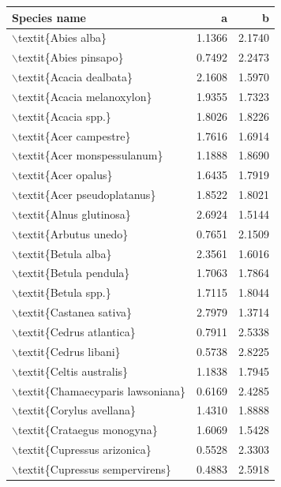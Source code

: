\begin{table}[ht]
\centering
\begin{tabular}{lrr}
  \hline
Species name & a & b \\ 
  \hline
$\backslash$textit\{Abies alba\} & 1.1366 & 2.1740 \\ 
  $\backslash$textit\{Abies pinsapo\} & 0.7492 & 2.2473 \\ 
  $\backslash$textit\{Acacia dealbata\} & 2.1608 & 1.5970 \\ 
  $\backslash$textit\{Acacia melanoxylon\} & 1.9355 & 1.7323 \\ 
  $\backslash$textit\{Acacia spp.\} & 1.8026 & 1.8226 \\ 
  $\backslash$textit\{Acer campestre\} & 1.7616 & 1.6914 \\ 
  $\backslash$textit\{Acer monspessulanum\} & 1.1888 & 1.8690 \\ 
  $\backslash$textit\{Acer opalus\} & 1.6435 & 1.7919 \\ 
  $\backslash$textit\{Acer pseudoplatanus\} & 1.8522 & 1.8021 \\ 
  $\backslash$textit\{Alnus glutinosa\} & 2.6924 & 1.5144 \\ 
  $\backslash$textit\{Arbutus unedo\} & 0.7651 & 2.1509 \\ 
  $\backslash$textit\{Betula alba\} & 2.3561 & 1.6016 \\ 
  $\backslash$textit\{Betula pendula\} & 1.7063 & 1.7864 \\ 
  $\backslash$textit\{Betula spp.\} & 1.7115 & 1.8044 \\ 
  $\backslash$textit\{Castanea sativa\} & 2.7979 & 1.3714 \\ 
  $\backslash$textit\{Cedrus atlantica\} & 0.7911 & 2.5338 \\ 
  $\backslash$textit\{Cedrus libani\} & 0.5738 & 2.8225 \\ 
  $\backslash$textit\{Celtis australis\} & 1.1838 & 1.7945 \\ 
  $\backslash$textit\{Chamaecyparis lawsoniana\} & 0.6169 & 2.4285 \\ 
  $\backslash$textit\{Corylus avellana\} & 1.4310 & 1.8888 \\ 
  $\backslash$textit\{Crataegus monogyna\} & 1.6069 & 1.5428 \\ 
  $\backslash$textit\{Cupressus arizonica\} & 0.5528 & 2.3303 \\ 
  $\backslash$textit\{Cupressus sempervirens\} & 0.4883 & 2.5918 \\ 

\end{tabular}
\end{table}
